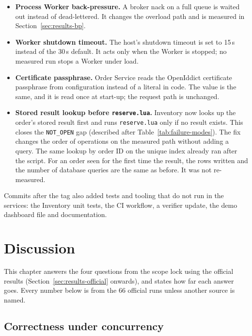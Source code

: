 \documentclass[a4paper]{report}
\begin{document}
\begin{itemize}
  \item \textbf{Process Worker back-pressure.} A broker nack
    on a full queue is waited out instead of dead-lettered. It changes the
    overload path and is measured in Section~\ref{sec:results-bp}.
  \item \textbf{Worker shutdown timeout.} The host's
    shutdown timeout is set to 15\,s instead of the 30\,s default. It acts
    only when the Worker is stopped; no measured run stops a Worker under
    load.
  \item \textbf{Certificate passphrase.} Order Service
    reads the OpenIddict certificate passphrase from configuration instead
    of a literal in code. The value is the same, and it is read once at
    start-up; the request path is unchanged.
  \item \textbf{Stored result lookup before \texttt{reserve.lua}.}
    Inventory now looks up the order's stored result first and runs
    \texttt{reserve.lua} only if no result exists. This closes the
    \texttt{NOT\_OPEN} gap (described after Table~\ref{tab:failure-modes}).
    The fix changes the order of operations on the measured path without
    adding a query. The same lookup by order ID on the unique index already
    ran after the script. For an order seen for
    the first time the result, the rows written and the number of database
    queries are the same as before. It was not re-measured.
\end{itemize}

Commits after the tag also added tests and tooling that do not run in the
services: the Inventory unit tests, the CI workflow, a verifier update, the
demo dashboard file and documentation.



\chapter{Discussion}
\label{sec:discussion}

This chapter answers the four questions from the scope lock using the
official results (Section~\ref{sec:results-official} onwards), and states
how far each answer
goes. Every number below is from the 66 official runs unless another source
is named.

\section{Correctness under concurrency}
\end{document}
